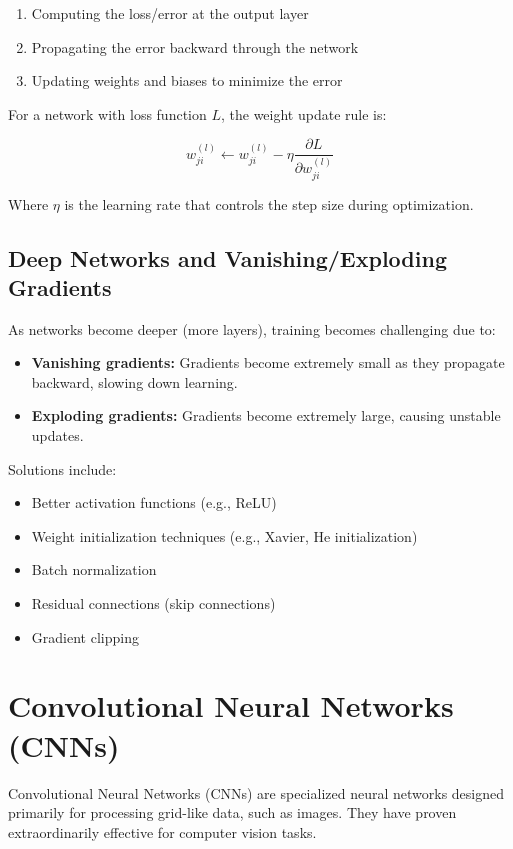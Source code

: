 \documentclass[11pt,a4paper]{report}
\begin{document}
\begin{enumerate}
    \item Computing the loss/error at the output layer
    \item Propagating the error backward through the network
    \item Updating weights and biases to minimize the error
\end{enumerate}

For a network with loss function $L$, the weight update rule is:

\begin{equation}
w_{ji}^{(l)} \leftarrow w_{ji}^{(l)} - \eta \frac{\partial L}{\partial w_{ji}^{(l)}}
\end{equation}

Where $\eta$ is the learning rate that controls the step size during optimization.

\subsection{Deep Networks and Vanishing/Exploding Gradients}
As networks become deeper (more layers), training becomes challenging due to:

\begin{itemize}
    \item \textbf{Vanishing gradients:} Gradients become extremely small as they propagate backward, slowing down learning.
    \item \textbf{Exploding gradients:} Gradients become extremely large, causing unstable updates.
\end{itemize}

Solutions include:
\begin{itemize}
    \item Better activation functions (e.g., ReLU)
    \item Weight initialization techniques (e.g., Xavier, He initialization)
    \item Batch normalization
    \item Residual connections (skip connections)
    \item Gradient clipping
\end{itemize}

\section{Convolutional Neural Networks (CNNs)}

Convolutional Neural Networks (CNNs) are specialized neural networks designed primarily for processing grid-like data, such as images. They have proven extraordinarily effective for computer vision tasks.
\end{document}
